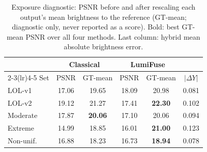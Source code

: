 \begin{table}[t]
\centering
\caption{Exposure diagnostic: PSNR before and after rescaling each output's mean brightness to the reference (GT-mean; diagnostic only, never reported as a score). Bold: best GT-mean PSNR over all four methods. Last column: hybrid mean absolute brightness error.}
\label{tab:exposure}
\setlength{\tabcolsep}{3pt}
\footnotesize
\begin{tabular}{l cc cc c}
\toprule
 & \multicolumn{2}{c}{Classical} & \multicolumn{2}{c}{LumiFuse} & \\
\cmidrule(lr){2-3}\cmidrule(lr){4-5}
Set & PSNR & GT-mean & PSNR & GT-mean & $|\Delta Y|$ \\
\midrule
LOL-v1 & 17.06 & 19.65 & 18.09 & 20.98 & 0.081 \\
LOL-v2 & 19.12 & 21.27 & 17.41 & \textbf{22.30} & 0.102 \\
Moderate & 17.87 & \textbf{20.06} & 17.10 & 20.06 & 0.094 \\
Extreme & 14.99 & 18.85 & 16.01 & \textbf{21.00} & 0.123 \\
Non-unif. & 16.88 & 18.23 & 16.73 & \textbf{18.94} & 0.078 \\
\bottomrule
\end{tabular}
\end{table}
